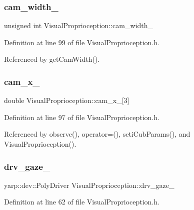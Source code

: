 \subsubsection{\texorpdfstring{cam\+\_\+width\+\_\+}{cam\_width\_}}
{\footnotesize\ttfamily unsigned int Visual\+Proprioception\+::cam\+\_\+width\+\_\+\hspace{0.3cm}{\ttfamily [protected]}}



Definition at line 99 of file Visual\+Proprioception.\+h.



Referenced by get\+Cam\+Width().

\mbox{\label{classVisualProprioception_ab98ec8641e0cfbed4628e11dd10c9fb8}} 
\subsubsection{\texorpdfstring{cam\+\_\+x\+\_\+}{cam\_x\_}}
{\footnotesize\ttfamily double Visual\+Proprioception\+::cam\+\_\+x\+\_\+\mbox{[}3\mbox{]}\hspace{0.3cm}{\ttfamily [protected]}}



Definition at line 97 of file Visual\+Proprioception.\+h.



Referenced by observe(), operator=(), seti\+Cub\+Params(), and Visual\+Proprioception().

\mbox{\label{classVisualProprioception_a73058b557c8169f92920f599ff0f7319}} 
\subsubsection{\texorpdfstring{drv\+\_\+gaze\+\_\+}{drv\_gaze\_}}
{\footnotesize\ttfamily yarp\+::dev\+::\+Poly\+Driver Visual\+Proprioception\+::drv\+\_\+gaze\+\_\+\hspace{0.3cm}{\ttfamily [protected]}}



Definition at line 62 of file Visual\+Proprioception.\+h.



